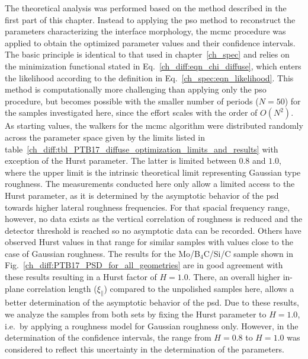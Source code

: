 The theoretical analysis was performed based on the method described in the first part of this chapter. Instead to applying the \gls{pso} method to reconstruct the parameters characterizing the interface morphology, the \gls{mcmc} procedure was applied to obtain the optimized parameter values and their confidence intervals. The basic principle is identical to that used in chapter~\ref{ch_spec} and relies on the minimization functional stated in Eq.~\eqref{ch_diff:eqn_chi_diffuse}, which enters the likelihood according to the definition in Eq.~\eqref{ch_spec:eqn_likelihood}. This method is computationally more challenging than applying only the \gls{pso} procedure, but becomes possible with the smaller number of periods ($N=50$) for the samples investigated here, since the effort scales with the order of $O(N^2)$. As starting values, the walkers for the \gls{mcmc} algorithm were distributed randomly across the parameter space given by the limits listed in table~\ref{ch_diff:tbl_PTB17_diffuse_optimization_limits_and_results} with exception of the Hurst parameter. The latter is limited between $0.8$ and $1.0$, where the upper limit is the intrinsic theoretical limit representing Gaussian type roughness. The measurements conducted here only allow a limited access to the Hurst parameter, as it is determined by the asymptotic behavior of the \gls{psd} towards higher lateral roughness frequencies. For that spacial frequency range, however, no data exists as the vertical correlation of roughness is reduced and the detector threshold is reached so no asymptotic data can be recorded. Others \cite{rack_comparative_2010} have observed Hurst values in that range for similar samples with values close to the case of Gaussian roughness. The results for the Mo/B$_4$C/Si/C sample shown in Fig.~\ref{ch_diff:PTB17_PSD_for_all_geometries} are in good agreement with these results resulting in a Hurst factor of $H=1.0$. There, an overall higher in-plane correlation length ($\xi_\parallel$) compared to the unpolished samples here, allows a better determination of the asymptotic behavior of the \gls{psd}. Due to these results, we analyze the samples from both sets by fixing the Hurst parameter to $H=1.0$, i.e.~by applying a roughness model for Gaussian roughness only. However, in the determination of the confidence intervals, the range from $H=0.8$ to $H=1.0$ was considered to reflect this uncertainty in the determination of the parameters. 

